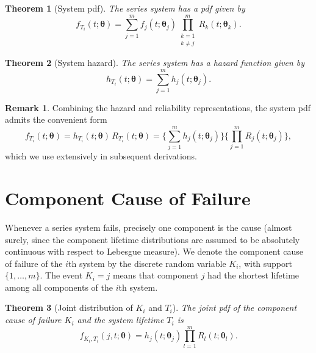 \documentclass[11pt]{article}
\theoremstyle{definition}
\newtheorem{remark}{Remark}
\theoremstyle{plain}
\newtheorem{theorem}{Theorem}
\renewcommand{\v}[1]{\boldsymbol{#1}}
\newcommand{\btheta}{\v{\theta}}
\begin{document}
\begin{theorem}[System pdf]
\label{thm:sys-pdf}
The series system has a pdf given by
\begin{equation}
\label{eq:sys-pdf}
    f_{T_i}(t; \btheta) = \sum_{j=1}^m f_j(t; \v{\theta}_j)
        \prod_{\substack{k=1 \\ k \neq j}}^m R_k(t; \v{\theta}_k).
\end{equation}
\end{theorem}

\begin{theorem}[System hazard]
\label{thm:sys-hazard}
The series system has a hazard function given by
\begin{equation}
\label{eq:sys-hazard}
    h_{T_i}(t; \btheta) = \sum_{j=1}^m h_j(t; \v{\theta}_j).
\end{equation}
\end{theorem}

\begin{remark}
Combining the hazard and reliability representations, the system pdf
admits the convenient form
\begin{equation}
\label{eq:sys-pdf-convenient}
    f_{T_i}(t; \btheta)
    = h_{T_i}(t; \btheta) \, R_{T_i}(t; \btheta)
    = \biggl\{\sum_{j=1}^m h_j(t; \v{\theta}_j)\biggr\}
      \biggl\{\prod_{j=1}^m R_j(t; \v{\theta}_j)\biggr\},
\end{equation}
which we use extensively in subsequent derivations.
\end{remark}


\section{Component Cause of Failure}
\label{sec:cause-of-failure}

Whenever a series system fails, precisely one component is the cause
(almost surely, since the component lifetime distributions are assumed
to be absolutely continuous with respect to Lebesgue measure).
We denote the component cause of failure of the $i$th system by the
discrete random variable $K_i$, with support $\{1, \ldots, m\}$.
The event $K_i = j$ means that component $j$ had the shortest lifetime
among all components of the $i$th system.

\begin{theorem}[Joint distribution of $K_i$ and $T_i$]
\label{thm:joint-kt}
The joint pdf of the component cause of failure $K_i$ and the system
lifetime $T_i$ is
\begin{equation}
\label{eq:joint-kt}
    f_{K_i, T_i}(j, t; \btheta) = h_j(t; \v{\theta}_j)
        \prod_{l=1}^m R_l(t; \v{\theta}_l).
\end{equation}
\end{theorem}
\end{document}
